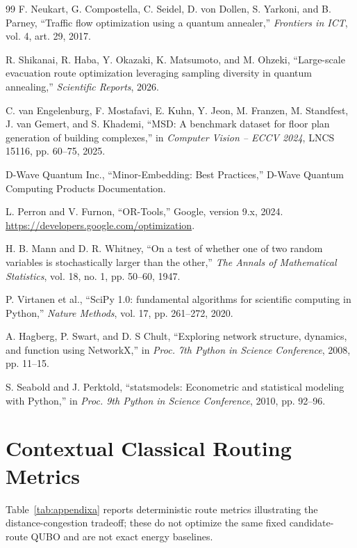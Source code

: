 \documentclass[11pt]{article}
\begin{document}
\begin{thebibliography}{99}
 F. Neukart, G. Compostella, C. Seidel, D. von Dollen, S. Yarkoni, and B. Parney, ``Traffic flow optimization using a quantum annealer,'' \textit{Frontiers in ICT}, vol. 4, art. 29, 2017.

 R. Shikanai, R. Haba, Y. Okazaki, K. Matsumoto, and M. Ohzeki, ``Large-scale evacuation route optimization leveraging sampling diversity in quantum annealing,'' \textit{Scientific Reports}, 2026.

 C. van Engelenburg, F. Mostafavi, E. Kuhn, Y. Jeon, M. Franzen, M. Standfest, J. van Gemert, and S. Khademi, ``MSD: A benchmark dataset for floor plan generation of building complexes,'' in \textit{Computer Vision -- ECCV 2024}, LNCS 15116, pp. 60--75, 2025.

 D-Wave Quantum Inc., ``Minor-Embedding: Best Practices,'' D-Wave Quantum Computing Products Documentation.

 L. Perron and V. Furnon, ``OR-Tools,'' Google, version 9.x, 2024. \url{https://developers.google.com/optimization}.

 H. B. Mann and D. R. Whitney, ``On a test of whether one of two random variables is stochastically larger than the other,'' \textit{The Annals of Mathematical Statistics}, vol. 18, no. 1, pp. 50--60, 1947.

 P. Virtanen et al., ``SciPy 1.0: fundamental algorithms for scientific computing in Python,'' \textit{Nature Methods}, vol. 17, pp. 261--272, 2020.

 A. Hagberg, P. Swart, and D. S Chult, ``Exploring network structure, dynamics, and function using NetworkX,'' in \textit{Proc. 7th Python in Science Conference}, 2008, pp. 11--15.

 S. Seabold and J. Perktold, ``statsmodels: Econometric and statistical modeling with Python,'' in \textit{Proc. 9th Python in Science Conference}, 2010, pp. 92--96.

\end{thebibliography}

\appendix

\section{Contextual Classical Routing Metrics}
Table~\ref{tab:appendixa} reports deterministic route metrics illustrating the distance-congestion tradeoff; these do not optimize the same fixed candidate-route QUBO and are not exact energy baselines.
\end{document}

